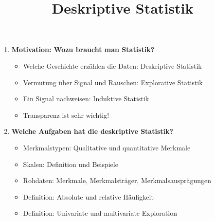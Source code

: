\documentclass[a4paper,fontsize=12pt]{scrartcl}
\title{Deskriptive Statistik}
\date{\vspace{-10ex}}
\begin{document}
\maketitle
\begin{enumerate}
\item{\textbf{Motivation: Wozu braucht man Statistik?}
  \begin{itemize}
    \item {Welche Geschichte erzählen die Daten: Deskriptive Statistik}
    \item {Vermutung über Signal und Rauschen: Explorative Statistik}
    \item {Ein Signal nachweisen: Induktive Statistik}
    \item {Transparenz ist sehr wichtig!}
  \end{itemize}
  }
  \item \textbf{Welche Aufgaben hat die deskriptive Statistik?}
  \begin{itemize}
     \item Merkmalstypen: Qualitative und quantitative Merkmale
     \item Skalen: Definition und Beispiele 
     \item Rohdaten: Merkmale, Merkmalsträger, Merkmalsausprägungen
     \item Definition: Absolute und relative Häufigkeit
     \item Definition: Univariate und multivariate Exploration
  \end{itemize}
  
   

\end{enumerate}
\end{document}
